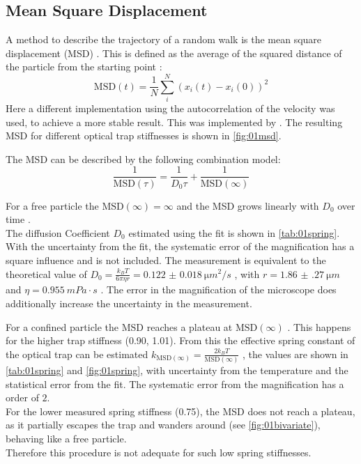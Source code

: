 \documentclass[
    twoside=false,
    twocolumn=true,
    fontsize=11pt,
]{scrarticle}
\begin{document}
\subsection*{Mean Square Displacement}
A method to describe the trajectory of a random walk is the mean square displacement (MSD) \cite{wiki:msd}.
This is defined as the average of the squared distance of the particle from the starting point \cite{wiki:msd}:
\begin{equation}
    \text{MSD}(t) = \frac{1}{N} \sum_i^N \left( x_i\left(t\right) - x_i\left(0\right) \right)^2 
\end{equation}
Here a different implementation using the autocorrelation of the velocity was used, to achieve a more stable result.
This was implemented by \cite{jl:msd}.
The resulting MSD for different optical trap stiffnesses is shown in \autoref{fig:01msd}.

The MSD can be described by the following combination model:
\begin{equation}
    \frac{1}{\text{MSD}(\tau)} = \frac{1}{D_0 \tau} + \frac{1}{\text{MSD}(\infty)}
    \label{eq:01_mdl_msd} 
\end{equation}

For a free particle the $\text{MSD}(\infty)=\infty$ and the MSD grows linearly with $D_0$ over time \cite{wiki:msd,instructions}.\\
The diffusion Coefficient $D_0$ estimated using the fit is shown in \autoref{tab:01spring}.
With the uncertainty from the fit, the systematic error of the magnification has a square influence and is not included.
The measurement is equivalent to the theoretical value of $D_0 = \frac{k_B T}{6 \pi \eta r} = \SI{0.122(18)}{\micro m ^2 / s}$ \cite{instructions}, with $r = \SI{1.86(27)}{\micro m}$ and $\eta = \SI{0.955}{mPa\cdot s}$ \cite{n:water}.
The error in the magnification of the microscope does additionally increase the uncertainty in the measurement.

For a confined particle the MSD reaches a plateau at $\text{MSD}(\infty)$ \cite{instructions}.
This happens for the higher trap stiffness (\SI{0.90}{}, \SI{1.01}{}).
From this the effective spring constant of the optical trap can be estimated $k_{\text{MSD}(\infty)} = \frac{2 k_B T}{\text{MSD}(\infty)}$ \cite{instructions},
the values are shown in  \autoref{tab:01spring} and \autoref{fig:01spring}, with uncertainty from the temperature and the statistical error from the fit.
The systematic error from the magnification has a order of $2$.\\
For the lower measured spring stiffness (\SI{0.75}{}), the MSD does not reach a plateau, as it partially escapes the trap and wanders around (see \autoref{fig:01bivariate}), behaving like a free particle.\\
Therefore this procedure is not adequate for such low spring stiffnesses.
\end{document}
